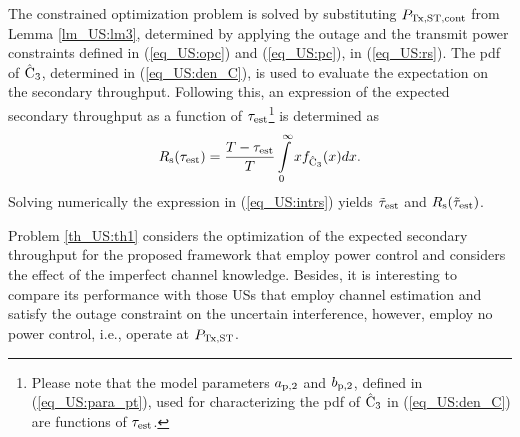 \begin{IEEEproof} [Solution]
The constrained optimization problem is solved by substituting $P_{\text{Tx,ST,cont}}$ from Lemma \ref{lm_US:lm3}, determined by applying the outage and the transmit power constraints defined in (\ref{eq_US:opc}) and (\ref{eq_US:pc}), in (\ref{eq_US:rs}). 
The pdf of $\hat{\text{{C}}}_{\text{3}}$, determined in (\ref{eq_US:den_C}), is used to evaluate the expectation on the secondary throughput. Following this, an expression of the expected secondary throughput as a function of $\tau_{\text{est}}$\footnote{Please note that the model parameters $a_{\text{p,2}}$ and $b_{\text{p,2}}$, defined in (\ref{eq_US:para_pt}), used for characterizing the pdf of $\hat{\text{{C}}}_{\text{3}}$ in (\ref{eq_US:den_C}) are functions of $\tau_{\text{est}}$.} is determined as
\begin{equation}
R_{\text{s}}(\tau_{\text{est}}) = \frac{T - \tau_{\text{est}}}{T} \int\limits_{0}^{\infty} x f_{\hat{\text{{C}}}_{\text{3}}}(x) dx. \label{eq_US:intrs}
\end{equation}
Solving numerically the expression in (\ref{eq_US:intrs}) yields $\tilde{\tau}_{\text{est}}$ and $R_{\text{s}}(\tilde{\tau}_{\text{est}})$. 
\end{IEEEproof}
\begin{coro} \label{cor_US:cor2}
\normalfont
Problem \ref{th_US:th1} considers the optimization of the expected secondary throughput for the proposed framework that employ power control and considers the effect of the imperfect channel knowledge.  Besides, it is interesting to compare its performance with those USs that employ channel estimation and satisfy the outage constraint on the uncertain interference, however, employ no power control, i.e., operate at $P_{\text{Tx,ST}}$. 
\end{coro}


